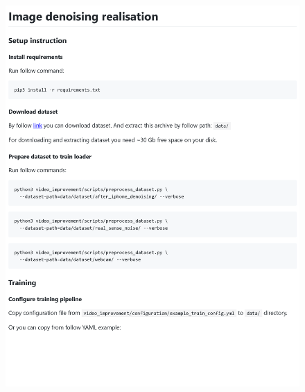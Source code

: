 \begin{figure}[h]
	\centering
	\includegraphics[width=\textwidth]{img/markdown/README_1}
	\label{fig:markdown_1}
\end{figure}

